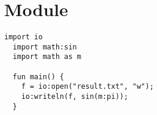\chapter{Module}

\begin{example}
  \begin{lstlisting}[language=intentio]
  import io
  import math:sin
  import math as m
  
  fun main() {
    f = io:open("result.txt", "w");
    io:writeln(f, sin(m:pi));
  }
\end{lstlisting}
\end{example}